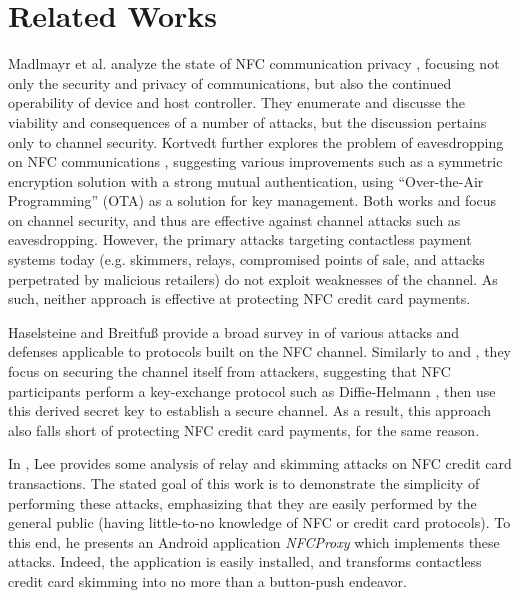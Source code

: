 \section{Related Works}
\label{sec:related}

Madlmayr et al. analyze the state of NFC communication privacy \cite{madlmayr2008nfc},
    focusing not only the security and privacy of communications, but also the continued operability of device and host controller.
They enumerate and discusse the viability and consequences of a number of attacks, but the discussion pertains only to channel security.
Kortvedt further explores the problem of eavesdropping on NFC communications \cite{kortvedt2009securing},
    suggesting various improvements such as a symmetric encryption solution with a strong mutual authentication,
    using ``Over-the-Air Programming'' (OTA) as a solution for key management.
Both works \cite{kortvedt2009securing} and \cite{madlmayr2008nfc} focus on channel security, and thus are effective against channel attacks such as eavesdropping.
However, the primary attacks targeting contactless payment systems today
    (e.g. skimmers, relays, compromised points of sale, and attacks perpetrated by malicious retailers) do not exploit weaknesses of the channel.
As such, neither approach is effective at protecting NFC credit card payments.

Haselsteine and Breitfu{\ss} provide a broad survey in \cite{haselsteiner2006security} of various attacks and defenses applicable to protocols built on the NFC channel.
Similarly to \cite{madlmayr2008nfc} and \cite{kortvedt2009securing}, they focus on securing the channel itself from attackers,
    suggesting that NFC participants perform a key-exchange protocol such as Diffie-Helmann \cite{diffiehellman},
    then use this derived secret key to establish a secure channel.
As a result, this approach also falls short of protecting NFC credit card payments, for the same reason.

In \cite{lee2012nfc}, Lee provides some analysis of relay and skimming attacks on NFC credit card transactions.
The stated goal of this work is to demonstrate the simplicity of performing these attacks,
    emphasizing that they are easily performed by the general public (having little-to-no knowledge of NFC or credit card protocols).
To this end, he presents an Android application \emph{NFCProxy} \cite{NFCProxy} which implements these attacks.
Indeed, the application is easily installed, and transforms contactless credit card skimming into no more than a button-push endeavor.

